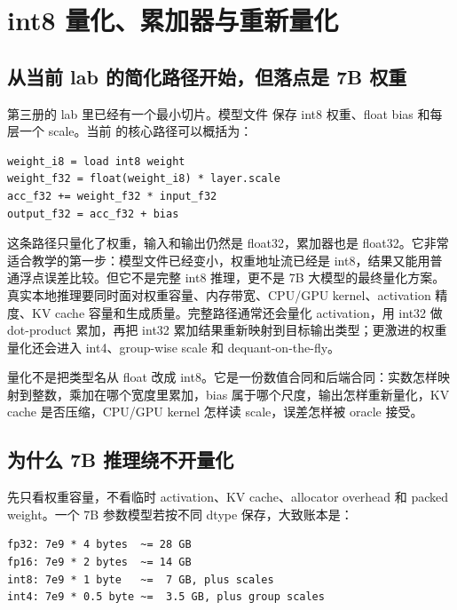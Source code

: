 \section{int8 量化、累加器与重新量化}

\subsection{从当前 lab 的简化路径开始，但落点是 7B 权重}

第三册的 lab 里已经有一个最小切片。模型文件  保存 int8 权重、float bias 和每层一个 scale。当前  的核心路径可以概括为：

\begin{lstlisting}[numbers=none,caption={当前 lab 的简化量化路径}]
weight_i8 = load int8 weight
weight_f32 = float(weight_i8) * layer.scale
acc_f32 += weight_f32 * input_f32
output_f32 = acc_f32 + bias
\end{lstlisting}

这条路径只量化了权重，输入和输出仍然是 float32，累加器也是 float32。它非常适合教学的第一步：模型文件已经变小，权重地址流已经是 int8，结果又能用普通浮点误差比较。但它不是完整 int8 推理，更不是 7B 大模型的最终量化方案。真实本地推理要同时面对权重容量、内存带宽、CPU/GPU kernel、activation 精度、KV cache 容量和生成质量。完整路径通常还会量化 activation，用 int32 做 dot-product 累加，再把 int32 累加结果重新映射到目标输出类型；更激进的权重量化还会进入 int4、group-wise scale 和 dequant-on-the-fly。

\begin{keyidea}
量化不是把类型名从 float 改成 int8。它是一份数值合同和后端合同：实数怎样映射到整数，乘加在哪个宽度里累加，bias 属于哪个尺度，输出怎样重新量化，KV cache 是否压缩，CPU/GPU kernel 怎样读 scale，误差怎样被 oracle 接受。
\end{keyidea}

\subsection{为什么 7B 推理绕不开量化}

先只看权重容量，不看临时 activation、KV cache、allocator overhead 和 packed weight。一个 7B 参数模型若按不同 dtype 保存，大致账本是：

\begin{lstlisting}[numbers=none,caption={7B 权重容量的粗略账本}]
fp32: 7e9 * 4 bytes  ~= 28 GB
fp16: 7e9 * 2 bytes  ~= 14 GB
int8: 7e9 * 1 byte   ~=  7 GB, plus scales
int4: 7e9 * 0.5 byte ~=  3.5 GB, plus group scales
\end{lstlisting}


